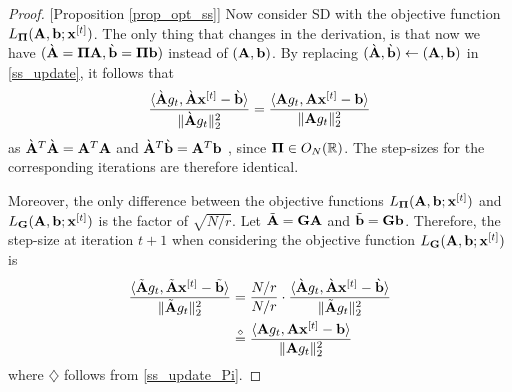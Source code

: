 \documentclass[journal,letterpaper,onecolumn,twoside,nofonttune]{IEEEtran}
\newcommand{\xb}{\bold{x}}
\newcommand{\Gb}{\bold{G}}
\newcommand{\Pibold}{\bold{\Pi}}
\newcommand{\R}{\mathbb{R}}
\newcommand{\Ab}{\bold{A}}
\newcommand{\Abt}{{\tilde{\bold{A}}}}
\newcommand{\Abg}{{\grave{\bold{A}}}}
\newcommand{\bb}{\bold{b}}
\newcommand{\bbt}{\tilde{\bold{b}}}
\newcommand{\bbg}{{\grave{\bold{b}}}}
\begin{document}
\begin{proof}{[Proposition \ref{prop_opt_ss}]}
Now consider SD with the objective function $L_{\Pibold}(\Ab,\bb;\xb^{[t]})$. The only thing that changes in the derivation, is that now we have $(\Abg=\Pibold\Ab,\bbg=\Pibold\bb)$ instead of $(\Ab,\bb)$. By replacing $(\Abg,\bbg)\gets(\Ab,\bb)$ in \eqref{ss_update}, it follows that
\begin{equation}
\label{ss_update_Pi}
  \frac{\langle\Abg g_t,\Abg\xb^{[t]}-\bbg\rangle}{\|\Abg g_t\|_2^2} = \frac{\langle\Ab g_t,\Ab\xb^{[t]}-\bb\rangle}{\|\Ab g_t\|_2^2}
\end{equation}
as $\Abg^T\Abg=\Ab^T\Ab$ and $\Abg^T\bbg=\Ab^T\bb$ , since $\Pibold\in O_N(\R)$. The step-sizes for the corresponding iterations are therefore identical.

Moreover, the only difference between the objective functions $L_{\Pibold}(\Ab,\bb;\xb^{[t]})$ and $L_{\Gb}(\Ab,\bb;\xb^{[t]})$ is the factor of $\sqrt{N/r}$. Let $\Abt=\Gb\Ab$ and $\bbt=\Gb\bb$. Therefore, the step-size at iteration $t+1$ when considering the objective function $L_{\Gb}(\Ab,\bb;\xb^{[t]})$ is
\begin{align*}
  \frac{\langle\Abt g_t,\Abt\xb^{[t]}-\bbt\rangle}{\|\Abt g_t\|_2^2} &= \frac{N/r}{N/r}\cdot\frac{\langle\Abg g_t,\Abg\xb^{[t]}-\bbg\rangle}{\|\Abt g_t\|_2^2} \\
  &\overset{\diamond}{=} \frac{\langle\Ab g_t,\Ab\xb^{[t]}-\bb\rangle}{\|\Ab g_t\|_2^2}
\end{align*}
where $\diamondsuit$ follows from \eqref{ss_update_Pi}.
\end{proof}
\end{document}
